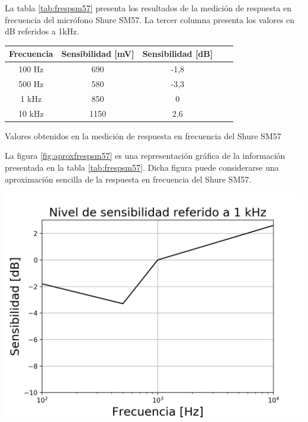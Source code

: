 \documentclass[]{article}
\makeatletter
\newenvironment{tablehere}    %
  {\def\@captype{table}}    %

  {}              %
\newenvironment{figurehere}   %
  {\def\@captype{figure}}   %
  {\par\medskip}
  {}              %
\makeatother
\begin{document}
\begin{multicols}{2}
La tabla \ref{tab:frespsm57} presenta los resultados de la medición de respuesta en
frecuencia del micrófono Shure SM57. La tercer columna presenta los valores en dB
referidos a 1kHz.

\begin{tablehere}
\begin{center}
\begin{tabular}{|c|c|c|c|c|}
\hline
Frecuencia & Sensibilidad [mV] & Sensibilidad [dB] \\
\hline
100 Hz & 690    & -1,8 \\
500 Hz & 580    & -3,3 \\
1  kHz & 850    & 0    \\
10 kHz & 1150   & 2,6  \\
\hline
\end{tabular}
\caption{Valores obtenidos en la medición de respuesta en frecuencia del
Shure SM57}
\label{tab:frespsm57}
\end{center}
\end{tablehere}

La figura \ref{fig:aproxfrespsm57} es una representación gráfica de la información
presentada en la tabla \ref{tab:frespsm57}. Dicha figura puede considerarse una
aproximación sencilla de la respuesta en frecuencia del Shure SM57.

\begin{figurehere}
 \centering
 \includegraphics[width=\linewidth]{frespsm57}
 \label{fig:aproxfrespsm57}
\end{figurehere}



\end{multicols}
\end{document}
